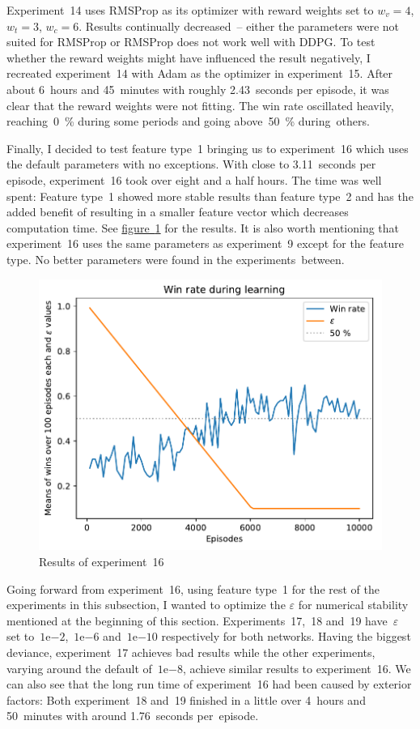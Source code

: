 \documentclass[a4paper,titlepage]{article}
\newcommand{\expn}[2]{{#1}\mathrm{e}{#2}}
\begin{document}
Experiment~14 uses RMSProp as its optimizer with reward weights set to $w_v = 4$, $w_t = 3$, $w_c = 6$. Results continually decreased~-- either the parameters were not suited for RMSProp or RMSProp does not work well with DDPG. To test whether the reward weights might have influenced the result negatively, I recreated experiment~14 with Adam as the optimizer in experiment~15. After about 6~hours and 45~minutes with roughly 2.43~seconds per episode, it was clear that the reward weights were not fitting. The win rate oscillated heavily, reaching~0~\% during some periods and going above~50~\% during~others.

Finally, I decided to test feature type~1 bringing us to experiment~16  which uses the default parameters with no exceptions. With close to 3.11~seconds per episode, experiment~16 took over eight and a half hours. The time was well spent: Feature type~1 showed more stable results than feature type~2 and has the added benefit of resulting in a smaller feature vector which decreases computation time. See \hyperref[fig:exp16]{figure~\ref*{fig:exp16}} for the results. It is also worth mentioning that experiment~16 uses the same parameters as experiment~9 except for the feature type. No better parameters were found in the experiments~between.
\begin{figure}
  \centering
  \includegraphics[width=\textwidth]{../experiments/exp16/win_stats.pdf}
  \caption{Results of experiment~16}
  \label{fig:exp16}
\end{figure}

Going forward from experiment~16, using feature type~1 for the rest of the experiments in this subsection, I wanted to optimize the $\varepsilon$ for numerical stability mentioned at the beginning of this section. Experiments~17,~18 and~19 have~$\varepsilon$ set to~$\expn{1}{-2}$,~$\expn{1}{-6}$ and~$\expn{1}{-10}$ respectively for both networks. Having the biggest deviance, experiment~17 achieves bad results while the other experiments, varying around the default of~$\expn{1}{-8}$, achieve similar results to experiment~16. We can also see that the long run time of experiment~16 had been caused by exterior factors: Both experiment~18 and~19 finished in a little over 4~hours and 50~minutes with around 1.76~seconds per~episode.
\end{document}
